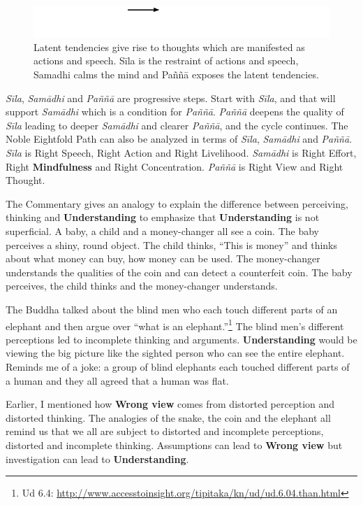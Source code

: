 \begin{figure}[H]
\centering
\includegraphics[width=0.6\linewidth]{./Diagrams/Sila}
\caption{Latent tendencies give rise to thoughts which are manifested as actions and speech. Sīla is the restraint of actions and speech, Samadhi calms the mind and Paññā exposes the latent tendencies.}
\label{fig:Sila}
\end{figure}

\textit{Sīla}, \textit{Samādhi} and \textit{Paññā} are progressive steps. Start with \textit{Sīla}, and that will support \textit{Samādhi} which is a condition for \textit{Paññā}. \textit{Paññā} deepens the quality of \textit{Sīla} leading to deeper \textit{Samādhi} and clearer \textit{Paññā}, and the cycle continues. The Noble Eightfold Path can also be analyzed in terms of \textit{Sīla}, \textit{Samādhi} and \textit{Paññā}. \textit{Sīla} is Right Speech, Right Action and Right Livelihood. \textit{Samādhi} is Right Effort, Right \textbf{Mindfulness} and Right Concentration. \textit{Paññā} is Right View and Right Thought.

The Commentary gives an analogy to explain the difference between perceiving, thinking and \textbf{Understanding} to emphasize that \textbf{Understanding} is not superficial. A baby, a child and a money-changer all see a coin. The baby perceives a shiny, round object. The child thinks, “This is money” and thinks about what money can buy, how money can be used. The money-changer understands the qualities of the coin and can detect a counterfeit coin. The baby perceives, the child thinks and the money-changer understands.

The Buddha talked about the blind men who each touch different parts of an elephant and then argue over “what is an elephant.”\footnote{Ud 6.4: \url{http://www.accesstoinsight.org/tipitaka/kn/ud/ud.6.04.than.html}} The blind men’s different perceptions led to incomplete thinking and arguments. \textbf{Understanding} would be viewing the big picture like the sighted person who can see the entire elephant. Reminds me of a joke: a group of blind elephants each touched different parts of a human and they all agreed that a human was flat.

Earlier, I mentioned how \textbf{Wrong view} comes from distorted perception and distorted thinking. The analogies of the snake, the coin and the elephant all remind us that we all are subject to distorted and incomplete perceptions, distorted and incomplete thinking. Assumptions can lead to \textbf{Wrong view} but investigation can lead to \textbf{Understanding}.

